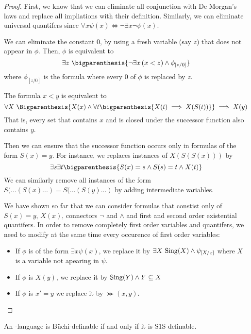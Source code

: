 \begin{proof}
    First, we know that we can eliminate all conjunction with De Morgan's
    laws and replace all impliations with their definition. Similarly, we can eliminate universal quantifers
    since $\forall x \psi(x) \iff \neg \exists x \neg \psi(x)$.

    We can eliminate the constant $0$, by using a fresh variable (say $z$)
    that does not appear in $\phi$. Then, $\phi$ is equivalent to
    \[
        \exists z~ \bigparenthesis{\neg\exists x\, (x < z) \wedge \phi_{[z/0]}}
    \]
    where $\phi_{[z/0]}$ is the formula where every 0 of $\phi$ is replaced by $z$.

    The formula $x < y$ is equivalent to \[
        \forall X~ \Bigparenthesis{
            X(x) \wedge \forall t \bigparenthesis{X(t) \implies X(S(t))}
        } \implies X(y)
    \]
    That is, every set that contains $x$ and is closed under the successor
    function also contains $y$.

    Then we can ensure that the successor function occurs only
    in formulas of the form $S(x) = y$. For instance,
    we replaces instances of $X(S(S(x)))$ by \[
        \exists s \exists t \bigparenthesis{
            S(x) = s \wedge S(s) = t \wedge X(t)
        }
    \]
    We can similarly remove all instances of the form $S(...(S(x)...) = S(...(S(y)...)$
    by adding intermediate variables.

    We have shown so far that we can consider formulas
    that constist only of $S(x) = y$, $X(x)$, connectors $\neg$ and $\wedge$
    and first and second order existential quantifers.
    In order to remove completely first order variables and quantifers,
    we need to modify at the same time every occurence of first order variables:
    \begin{itemize}
        \item If $\phi$ is of the form $\exists x \psi(x)$, we replace it by
            $\exists X ~ \mathrm{Sing}(X) \wedge \psi_{[X/x]}$ where $X$ is a variable not apearing
            in $\psi$.
        \item If $\phi$ is $X(y)$, we replace it by $\mathrm{Sing}(Y) \wedge Y \subseteq X$
        \item If $\phi$ is $x' = y$ we replace it by $\Succ(x, y)$.
    \end{itemize}
\end{proof}

\begin{theorem}
    An \w-language is Büchi-definable if and only if
    it is S1S definable.
\end{theorem}

